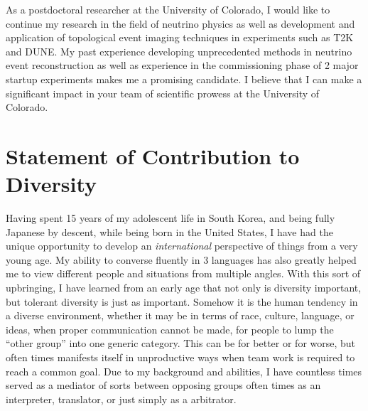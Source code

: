 \documentclass[10pt]{article} %
\begin{document}

As a postdoctoral researcher at the University of Colorado, I would like to
continue my research in the field of neutrino physics as well as development
and application of topological event imaging techniques in experiments such as
T2K and DUNE. My past experience developing unprecedented methods in neutrino
event reconstruction as well as experience in the commissioning phase of 2
major startup experiments makes me a promising candidate. I believe that I can
make a significant impact in your team of scientific prowess at the University
of Colorado.

\clearpage
\section{Statement of Contribution to Diversity}

Having spent 15 years of my adolescent life in South Korea, and being fully
Japanese by descent, while being born in the United States, I have had the
unique opportunity to develop an \emph{international} perspective of things
from a very young age. My ability to converse fluently in 3 languages has also
greatly helped me to view different people and situations from multiple angles.
With this sort of upbringing, I have learned from an early age that not only is
diversity important, but tolerant diversity is just as important. Somehow it is
the human tendency in a diverse environment, whether it may be in terms of
race, culture, language, or ideas, when proper communication cannot be made,
for people to lump the ``other group'' into one generic category. This can be
for better or for worse, but often times manifests itself in unproductive ways
when team work is required to reach a common goal. Due to my background and
abilities, I have countless times served as a mediator of sorts between
opposing groups often times as an interpreter, translator, or just simply as a
arbitrator.
\end{document}
